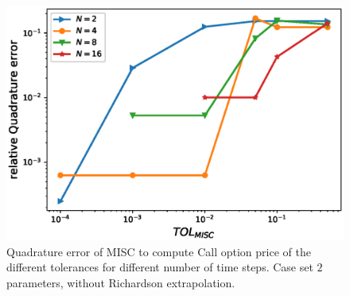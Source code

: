 \documentclass[11pt]{article}
\begin{document}
\begin{figure}[h!]
	\centering
	\includegraphics[width=0.7\linewidth]{./figures/rBergomi_MISC_quadratre_error/vs_TOL/set2/relative_quad_error_wrt_MISC_TOL_set2_non_rich_linear}
	
	
	\caption{Quadrature error of MISC to compute Call option price of the different tolerances for different number of time steps. Case  set $2$ parameters, without Richardson extrapolation.}
	\label{fig:Quadrature_error_set2_linear}
\end{figure}
\end{document}
